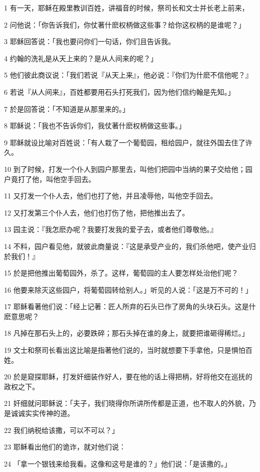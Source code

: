 \par 1 有一天，耶稣在殿里教训百姓，讲福音的时候，祭司长和文士并长老上前来，
\par 2 问他说：「你告诉我们，你仗著什麽权柄做这些事？给你这权柄的是谁呢？」
\par 3 耶稣回答说：「我也要问你们一句话，你们且告诉我。
\par 4 约翰的洗礼是从天上来的？是从人间来的呢？」
\par 5 他们彼此商议说：「我们若说『从天上来』，他必说：『你们为什麽不信他呢？』
\par 6 若说『从人间来』，百姓都要用石头打死我们，因为他们信约翰是先知。」
\par 7 於是回答说：「不知道是从那里来的。」
\par 8 耶稣说：「我也不告诉你们，我仗著什麽权柄做这些事。」
\par 9 耶稣就设比喻对百姓说：「有人栽了一个葡萄园，租给园户，就往外国去住了许久。
\par 10 到了时候，打发一个仆人到园户那里去，叫他们把园中当纳的果子交给他；园户竟打了他，叫他空手回去。
\par 11 又打发一个仆人去，他们也打了他，并且凌辱他，叫他空手回去。
\par 12 又打发第三个仆人去，他们也打伤了他，把他推出去了。
\par 13 园主说：『我怎麽办呢？我要打发我的爱子去，或者他们尊敬他。』
\par 14 不料，园户看见他，就彼此商量说：『这是承受产业的，我们杀他吧，使产业归於我们！』
\par 15 於是把他推出葡萄园外，杀了。这样，葡萄园的主人要怎样处治他们呢？
\par 16 他要来除灭这些园户，将葡萄园转给别人。」听见的人说：「这是万不可的！」
\par 17 耶稣看著他们说：「经上记著：匠人所弃的石头已作了房角的头块石头。这是什麽意思呢？
\par 18 凡掉在那石头上的，必要跌碎；那石头掉在谁的身上，就要把谁砸得稀烂。」
\par 19 文士和祭司长看出这比喻是指著他们说的，当时就想要下手拿他，只是惧怕百姓。
\par 20 於是窥探耶稣，打发奸细装作好人，要在他的话上得把柄，好将他交在巡抚的政权之下。
\par 21 奸细就问耶稣说：「夫子，我们晓得你所讲所传都是正道，也不取人的外貌，乃是诚诚实实传神的道。
\par 22 我们纳税给该撒，可以不可以？」
\par 23 耶稣看出他们的诡诈，就对他们说：
\par 24 「拿一个银钱来给我看。这像和这号是谁的？」他们说：「是该撒的。」
